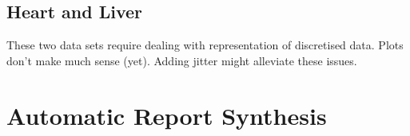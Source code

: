 \documentclass[a4paper,12pt ]{report}
\begin{document}
\begin{center}

\end{center}


\subsection{Heart and Liver}

These two data sets require dealing with representation of discretised data. Plots don't make much sense (yet). Adding jitter might alleviate these issues.  


\clearpage

\section{Automatic Report Synthesis}
\end{document}
